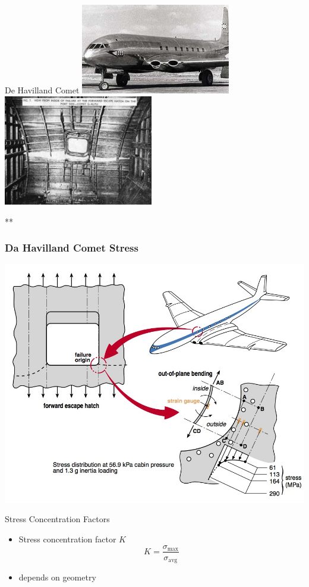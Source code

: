 \documentclass[10pt, svgnames]{beamer}
\begin{document}
\begin{frame}[label={sec:org651e6fb}]{De Havilland Comet}
\includegraphics[width=0.49\textwidth]{pictures/airplane-stress-conc}
\includegraphics[width=0.49\textwidth]{pictures/airplane-broken-fuselage}


**
  \frametitle{Da Havilland Comet Stress}
  \centering
  \includegraphics[height=0.87\textheight]{pictures/de-havilland-stress}
\end{frame}

\begin{frame}[label={sec:org0ae8dc9}]{Stress Concentration Factors}
\begin{itemize}
\item Stress concentration factor $K$
  $$ K = \frac{\sigma_{\max}}{\sigma_{\text{avg}}} $$
\item depends on geometry
\end{itemize}
\end{frame}
\end{document}

